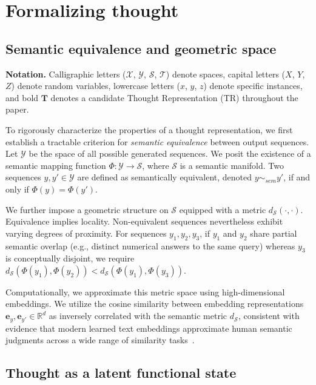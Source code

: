 \section{Formalizing thought}
\label{methodology}

\subsection{Semantic equivalence and geometric space}

\textbf{Notation.} Calligraphic letters ($\mathcal{X}$, $\mathcal{Y}$, $\mathcal{S}$, $\mathcal{T}$) denote spaces, capital letters ($X$, $Y$, $Z$) denote random variables, lowercase letters ($x$, $y$, $z$) denote specific instances, and bold $\mathbf{T}$ denotes a candidate Thought Representation (TR) throughout the paper.

To rigorously characterize the properties of a thought representation, we first establish a tractable criterion for \emph{semantic equivalence} between output sequences. Let $\mathcal{Y}$ be the space of all possible generated sequences. We posit the existence of a semantic mapping function $\Phi: \mathcal{Y} \to \mathcal{S}$, where $\mathcal{S}$ is a semantic manifold. Two sequences $y, y' \in \mathcal{Y}$ are defined as semantically equivalent, denoted $y \sim_{sem} y'$, if and only if $\Phi(y) = \Phi(y')$.

We further impose a geometric structure on $\mathcal{S}$ equipped with a metric $d_\mathcal{S}(\cdot, \cdot)$. Equivalence implies locality. Non-equivalent sequences nevertheless exhibit varying degrees of proximity. For sequences $y_1, y_2, y_3$, if $y_1$ and $y_2$ share partial semantic overlap (e.g., distinct numerical answers to the same query) whereas $y_3$ is conceptually disjoint, we require $d_\mathcal{S}(\Phi(y_1), \Phi(y_2)) < d_\mathcal{S}(\Phi(y_1), \Phi(y_3))$.

Computationally, we approximate this metric space using high-dimensional embeddings. We utilize the cosine similarity between embedding representations $\mathbf{e}_y, \mathbf{e}_{y'} \in \mathbb{R}^d$ as inversely correlated with the semantic metric $d_\mathcal{S}$, consistent with evidence that modern learned text embeddings approximate human semantic judgments across a wide range of similarity tasks~\citep{assadi2026hume}.

\subsection{Thought as a latent functional state}

